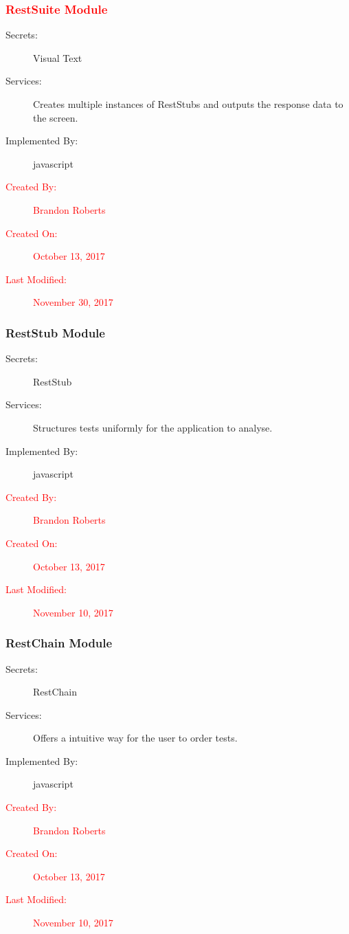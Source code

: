 \documentclass[12pt, titlepage]{article}
\begin{document}
\subsubsection{\textcolor{red}{RestSuite Module}}\label{m6}
\begin{description}
\item[Secrets:] Visual Text
\item[Services:]Creates multiple instances of RestStubs and outputs the response data to the screen.
\item[Implemented By:] javascript
\item[\textcolor{red}{Created By:}] \textcolor{red}{Brandon Roberts}
\item[\textcolor{red}{Created On:}] \textcolor{red}{October 13, 2017}
\item[\textcolor{red}{Last Modified:}] \textcolor{red}{November 30, 2017}
\end{description}

\subsubsection{RestStub Module}\label{m7}
\begin{description}
\item[Secrets:] RestStub
\item[Services:] Structures tests uniformly for the application to analyse.
\item[Implemented By:] javascript
\item[\textcolor{red}{Created By:}] \textcolor{red}{Brandon Roberts}
\item[\textcolor{red}{Created On:}] \textcolor{red}{October 13, 2017}
\item[\textcolor{red}{Last Modified:}] \textcolor{red}{November 10, 2017}
\end{description}

\subsubsection{RestChain Module}\label{m8}
\begin{description}
\item[Secrets:] RestChain
\item[Services:] Offers a intuitive way for the user to order tests.
\item[Implemented By:] javascript
\item[\textcolor{red}{Created By:}] \textcolor{red}{Brandon Roberts}
\item[\textcolor{red}{Created On:}] \textcolor{red}{October 13, 2017}
\item[\textcolor{red}{Last Modified:}] \textcolor{red}{November 10, 2017}
\end{description}
\end{document}
